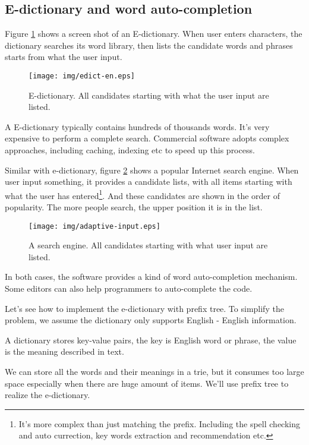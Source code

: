 \documentclass{article}
\begin{document}
\subsection{E-dictionary and word auto-completion}
Figure \ref{fig:e-dict} shows a screen shot of an E-dictionary.
When user enters characters,
the dictionary searches its word library, then lists the candidate words and
phrases starts from what the user input.

\begin{figure}[htbp]
  \centering
  \texttt{[image: img/edict-en.eps]}
  \caption{E-dictionary. All candidates starting with what the user input are listed.}
  \label{fig:e-dict}
\end{figure}

A E-dictionary typically contains hundreds of thousands words. It's very expensive
to perform a complete search. Commercial software adopts complex approaches, including
caching, indexing etc to speed up this process.

Similar with e-dictionary, figure \ref{fig:word-completion} shows a popular
Internet search engine. When user input something, it provides a candidate
lists, with all items starting with what the user has entered\footnote{It's more complex than just matching the prefix. Including the spell checking and auto currection, key words extraction and recommendation etc.}. And these candidates
are shown in the order of popularity. The more people search, the
upper position it is in the list.

\begin{figure}[htbp]
  \centering
  \texttt{[image: img/adaptive-input.eps]}
  \caption{A search engine. All candidates starting with what user input are listed.}
  \label{fig:word-completion}
\end{figure}

In both cases, the software provides a kind of word auto-completion mechanism.
Some editors can also help programmers to auto-complete the code.

Let's see how to implement the e-dictionary with prefix tree.
To simplify the problem, we assume the dictionary only supports English - English
information.

A dictionary stores key-value pairs, the key is English
word or phrase, the value is the meaning described in text.

We can store all the words and their meanings in a trie, but it consumes
too large space especially when there are huge amount of items. We'll use
prefix tree to realize the e-dictionary.
\end{document}
